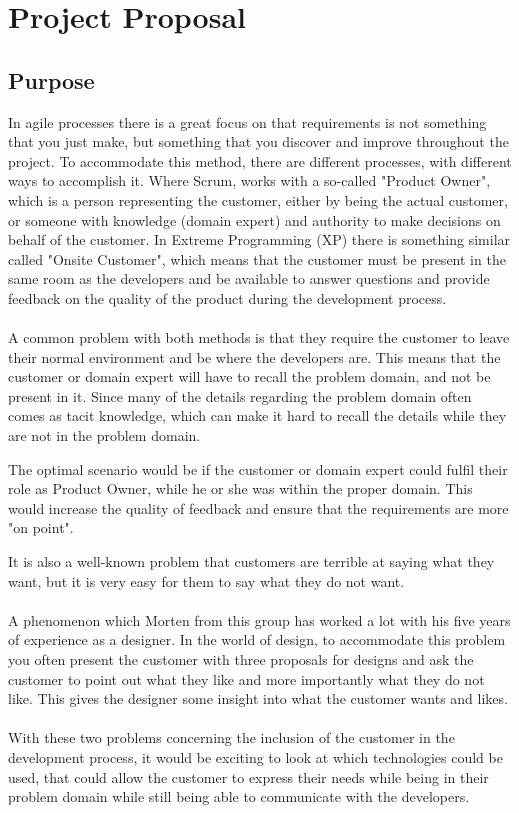\section{Project Proposal}
\subsection{Purpose}
In agile processes there is a great focus on that requirements is not something that you just make, but something that you discover and improve throughout the project.
To accommodate this method, there are different processes, with different ways to accomplish it. 
Where Scrum, works with a so-called "Product Owner", which is a person representing the customer, either by being the actual customer, or someone with knowledge (domain expert) and authority to make decisions on behalf of the customer. 
In Extreme Programming (XP) there is something similar called "Onsite Customer", which means that the customer must be present in the same room as the developers and be available to answer questions and provide feedback on the quality of the product during the development process. 
\\\\
A common problem with both methods is that they require the customer to leave their normal environment and be where the developers are. 
This means that the customer or domain expert will have to recall the problem domain, and not be present in it.
Since many of the details regarding the problem domain often comes as tacit knowledge, which can make it hard to recall the details while they are not in the problem domain. 

The optimal scenario would be if the customer or domain expert could fulfil their role as Product Owner, while he or she was within the proper domain. 
This would increase the quality of feedback and ensure that the requirements are more "on point".

It is also a well-known problem that customers are terrible at saying what they want, but it is very easy for them to say what they do not want.
\\\\
A phenomenon which Morten from this group has worked a lot with his five years of experience as a designer.
In the world of design, to accommodate this problem you often present the customer with three proposals for designs and ask the customer to point out what they like and more importantly what they do not like.
This gives the designer some insight into what the customer wants and likes. 
\\\\
With these two problems concerning the inclusion of the customer in the development process, it would be exciting to look at which technologies could be used, that could allow the customer to express their needs while being in their problem domain while still being able to communicate with the developers. 

